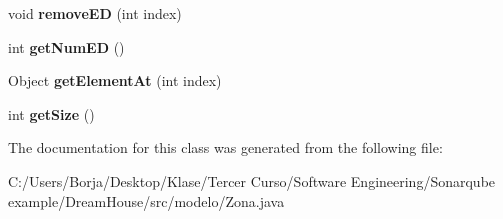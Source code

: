 \begin{DoxyCompactItemize}
void {\bfseries remove\+ED} (int index)
\item 
\mbox{\label{classmodelo_1_1_zona_a58d50274740c05a3a0c04b2a023c3d84}} 
int {\bfseries get\+Num\+ED} ()
\item 
\mbox{\label{classmodelo_1_1_zona_ad1781d96d3ed190531dd3bc34905339e}} 
Object {\bfseries get\+Element\+At} (int index)
\item 
\mbox{\label{classmodelo_1_1_zona_a9831f30d3c5b31050915357f41d1e288}} 
int {\bfseries get\+Size} ()
\end{DoxyCompactItemize}


The documentation for this class was generated from the following file\+:\begin{DoxyCompactItemize}
\item 
C\+:/\+Users/\+Borja/\+Desktop/\+Klase/\+Tercer Curso/\+Software Engineering/\+Sonarqube example/\+Dream\+House/src/modelo/Zona.\+java\end{DoxyCompactItemize}
